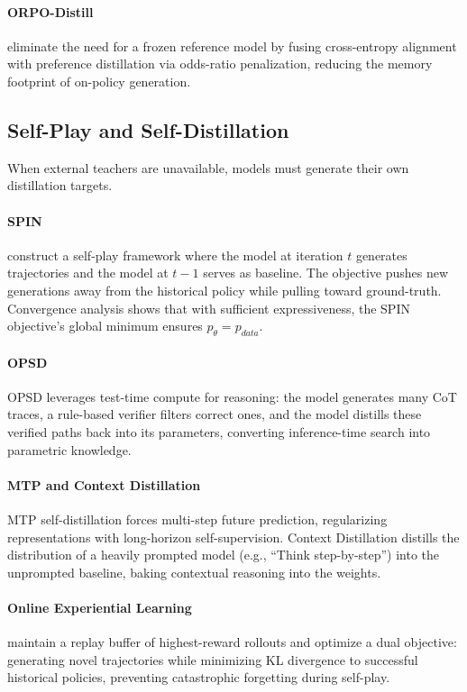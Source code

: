 \documentclass{article} %
\begin{document}
\paragraph{ORPO-Distill}
\citet{2509.25100} eliminate the need for a frozen reference model by fusing cross-entropy alignment with preference distillation via odds-ratio penalization, reducing the memory footprint of on-policy generation.

\subsection{Self-Play and Self-Distillation}
\label{subsec:self_distill}

When external teachers are unavailable, models must generate their own distillation targets.

\paragraph{SPIN}
\citet{2401.01335} construct a self-play framework where the model at iteration $t$ generates trajectories and the model at $t-1$ serves as baseline. The objective pushes new generations away from the historical policy while pulling toward ground-truth. Convergence analysis shows that with sufficient expressiveness, the SPIN objective's global minimum ensures $p_\theta = p_{data}$.

\paragraph{OPSD}
OPSD \citep{2601.18734} leverages test-time compute for reasoning: the model generates many CoT traces, a rule-based verifier filters correct ones, and the model distills these verified paths back into its parameters, converting inference-time search into parametric knowledge.

\paragraph{MTP and Context Distillation}
MTP self-distillation \citep{2602.06019} forces multi-step future prediction, regularizing representations with long-horizon self-supervision. Context Distillation \citep{2602.12275} distills the distribution of a heavily prompted model (e.g., ``Think step-by-step'') into the unprompted baseline, baking contextual reasoning into the weights.

\paragraph{Online Experiential Learning}
\citet{2603.16856} maintain a replay buffer of highest-reward rollouts and optimize a dual objective: generating novel trajectories while minimizing KL divergence to successful historical policies, preventing catastrophic forgetting during self-play.
\end{document}

